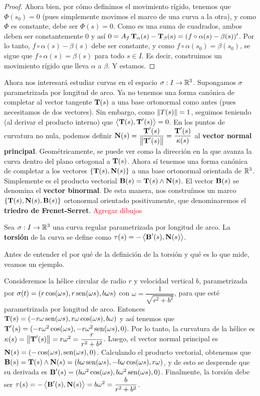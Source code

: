 \begin{teo}
\begin{proof}
Ahora bien, por cómo definimos el movimiento rígido, tenemos que $\Phi(s_0)=0$ (pues simplemente movimos el marco de una curva a la otra), y como $\Phi$ es constante, debe ser $\Phi(s)=0$. Como es una suma de cuadrados, ambos deben ser constantemente $0$ y así $0=A_f\operatorname{\mathbf{T}}_\alpha(s)-\operatorname{\mathbf{T}}_\beta(s) = (f\circ\alpha(s)-\beta(s))'$. Por lo tanto, $f\circ\alpha(s)-\beta(s)$ debe ser constante, y como $f\circ\alpha(s_0)=\beta(s_0)$, se sigue que $f\circ\alpha(s)=\beta(s)$ para todo $s\in I$. Es decir, construimos un movimiento rígido que lleva $\alpha$ a $\beta$. Y estamos.
\end{proof}
\end{teo}

Ahora nos interesará estudiar curvas en el espacio $\sigma:I\to\mathbb{R}^3$. Supongamos $\sigma$ parametrizada por longitud de arco. Ya no tenemos una forma canónica de completar al vector tangente $\operatorname{\mathbf{T}}(s)$ a una base ortonormal como antes (pues necesitamos de dos vectores). Sin embargo, como $\left\| T(s) \right\|=1$, seguimos teniendo (al derivar el producto interno) que $\left\langle \operatorname{\mathbf{T}}(s),\operatorname{\mathbf{T}}'(s) \right\rangle=0$. En los puntos de curvatura no nula, podemos definir $\operatorname{\mathbf{N}}(s)=\dfrac{\operatorname{\mathbf{T}}'(s)}{\left\| \operatorname{\mathbf{T}}'(s) \right\|} = \dfrac{\operatorname{\mathbf{T}}'(s)}{\kappa(s)}$ al \textbf{vector normal principal}. Geométricamente, se puede ver como la dirección en la que avanza la curva dentro del plano ortogonal a $\operatorname{\mathbf{T}}(s)$. Ahora sí tenemos una forma canónica de completar a los vectores $\{\operatorname{\mathbf{T}}(s),\operatorname{\mathbf{N}}(s)\}$ a una base ortonormal orientada de $\mathbb{R}^3$. Simplemente es el producto vectorial $\operatorname{\mathbf{B}}(s)=\operatorname{\mathbf{T}}(s)\wedge\operatorname{\mathbf{N}}(s)$. El vector $\operatorname{\mathbf{B}}(s)$ se denomina el \textbf{vector binormal}.  De esta manera, nos construímos un marco $\{\operatorname{\mathbf{T}}(s),\operatorname{\mathbf{N}}(s),\operatorname{\mathbf{B}}(s)\}$ ortonormal orientado positivamente, que denominaremos el \textbf{triedro de Frenet-Serret}. \textcolor{red}{Agregar dibujos}

\begin{defn}
Sea $\sigma:I\to\mathbb{R}^3$ una curva regular parametrizada por longitud de arco. La \textbf{torsión} de la curva se define como $\tau(s)=-\left\langle \operatorname{\mathbf{B}}'(s),\operatorname{\mathbf{N}}(s) \right\rangle$.
\end{defn}

Antes de entender el por qué de la definición de la torsión y qué es lo que mide, veamos un ejemplo.

\begin{ex}
Consideremos la hélice circular de radio $r$ y velocidad vertical $b$, parametrizada por $\sigma(t) = (r\cos(\omega s),r\operatorname{sen}(\omega s),b\omega s)$ con $\omega = \dfrac{1}{\sqrt{r^2+b^2}}$, para que esté parametrizada por longitud de arco. Entonces $\operatorname{\mathbf{T}}(s)=(-r\omega\operatorname{sen}(\omega s),r\omega\cos(\omega s),b\omega)$ y así tenemos que $\operatorname{\mathbf{T}}'(s)=(-r\omega^2\cos(\omega s),-r\omega^2 \operatorname{sen}(\omega s),0)$. Por lo tanto, la curvatura de la hélice es $\kappa(s)=\left\| \operatorname{\mathbf{T}}'(s) \right\| = r\omega^2 = \dfrac{r}{r^2+b^2}$. Luego, el vector normal principal es $\operatorname{\mathbf{N}}(s)=(-\cos(\omega s),\operatorname{sen}(\omega s),0)$. Calculando el producto vectorial, obtenemos que $\operatorname{\mathbf{B}}(s)=\operatorname{\mathbf{T}}(s)\wedge\operatorname{\mathbf{N}}(s)=(b\omega\operatorname{sen}(\omega s),-b\omega\cos(\omega s),r\omega)$, y de esto se desprende que su derivada es $\operatorname{\mathbf{B}}'(s)=(b\omega^2\cos(\omega s),b\omega^2 \operatorname{sen}(\omega s),0)$. Finalmente, la torsión debe ser $\tau(s)=-\left\langle \operatorname{\mathbf{B}}'(s),\operatorname{\mathbf{N}}(s) \right\rangle = b\omega^2 = \dfrac{b}{r^2+b^2}$.
\end{ex}

